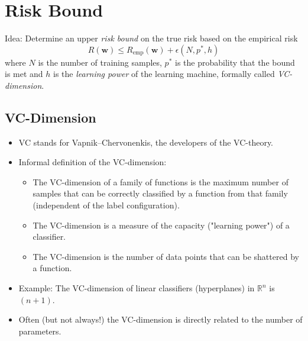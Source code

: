\documentclass[a4paper, 11pt, accentcolor = tud3b]{tudreport}
\newcommand{\R}{\ensuremath{\mathbb{R}}}
\newcommand{\emp}{\textrm{emp}}
\renewcommand{\vec}[1]{\mathbf{#1}}
\begin{document}
		\section{Risk Bound}
			Idea: Determine an upper \emph{risk bound} on the true risk based on the empirical risk
			\begin{equation}
				R(\vec{w}) \leq R_\emp(\vec{w}) + \epsilon(N, p^\ast, h)
			\end{equation}
			where \(N\) is the number of training samples, \(p^\ast\) is the probability that the bound is met and \(h\) is the \emph{learning power} of the learning machine, formally called \emph{VC-dimension}.

			\subsection{VC-Dimension}
				\begin{itemize}
					\item VC stands for Vapnik–Chervonenkis, the developers of the VC-theory.
					\item Informal definition of the VC-dimension:
						\begin{itemize}
							\item The VC-dimension of a family of functions is the maximum number of samples that can be correctly classified by a function from that family (independent of the label configuration).
							\item The VC-dimension is a measure of the capacity ("learning power") of a classifier.
							\item The VC-dimension is the number of data points that can be shattered by a function.
						\end{itemize}
					\item Example: The VC-dimension of linear classifiers (hyperplanes) in \(\R^n\) is \( (n + 1) \).
					\item Often (but not always!) the VC-dimension is directly related to the number of parameters.
				\end{itemize}
\end{document}
